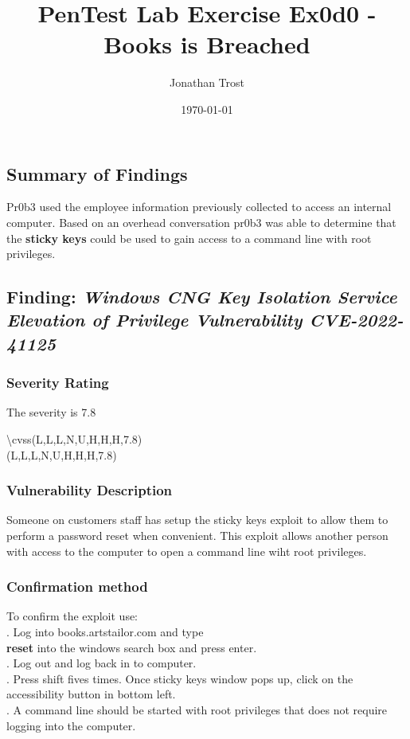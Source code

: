 \documentclass[notitlepage]{article}
\begin{document}
	
	
	\title{PenTest Lab Exercise Ex0d0 - Books is Breached}
	\author{Jonathan Trost}
	\date{\isodate\today}
	
	\maketitle
	
	\tableofcontents
	
	\newpage 
	
		\subsection{Summary of Findings}
	\indent Pr0b3 used the employee information previously collected to access an internal computer. Based on an overhead conversation pr0b3 was able to determine that the \textbf{sticky keys} could be used to gain access to a command line with root privileges. 
	
	\subsection{Finding: \emph{Windows CNG Key Isolation Service Elevation of Privilege Vulnerability CVE-2022-41125}}
	
	\subsubsection{Severity Rating}
	\indent The severity is 7.8 
	
	\textbackslash cvss(L,L,L,N,U,H,H,H,7.8)\\
	\cvss(L,L,L,N,U,H,H,H,7.8) \\
	
	\subsubsection{Vulnerability Description}
	\indent Someone on customers staff has setup the sticky keys exploit to allow them to perform a password reset when convenient. This exploit allows another person with access to the computer to open a command line wiht root privileges.  \\
	
	\subsubsection{Confirmation method}
	To confirm the exploit use: \\
	. Log into books.artstailor.com and type \textbf{\\reset} into the windows search box and press enter.  \\
	. Log out and log back in to computer. \\
	. Press shift fives times.  Once sticky keys window pops up, click on the accessibility button in bottom left. \\
	. A command line should be started with root privileges that does not require logging into the computer. 
	
\end{document}
